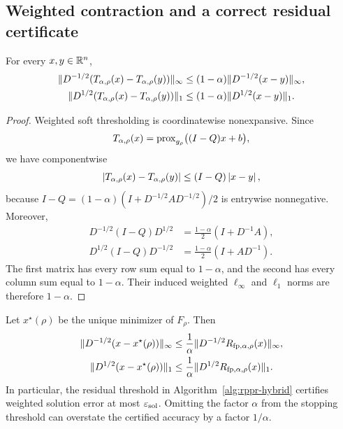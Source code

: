\subsection{Weighted contraction and a correct residual certificate}

\begin{lemma}
\label{lem:rppr-weighted-contraction}
For every $x,y\in\mathbb{R}^n$,
\begin{align}
  \lVert D^{-1/2}(T_{\alpha,\rho}(x)-T_{\alpha,\rho}(y))\rVert_\infty
  &\leq
  (1-\alpha)\lVert D^{-1/2}(x-y)\rVert_\infty,
  \label{eq:rppr-infty-contraction}\\
  \lVert D^{1/2}(T_{\alpha,\rho}(x)-T_{\alpha,\rho}(y))\rVert_1
  &\leq
  (1-\alpha)\lVert D^{1/2}(x-y)\rVert_1.
  \label{eq:rppr-l1-contraction}
\end{align}
\end{lemma}

\begin{proof}
Weighted soft thresholding is coordinatewise nonexpansive.  Since
\[
  T_{\alpha,\rho}(x)
  =\operatorname{prox}_{g_\rho}\bigl((I-Q)x+b\bigr),
\]
we have componentwise
\[
  \left\lvert T_{\alpha,\rho}(x)-T_{\alpha,\rho}(y) \right\rvert
  \leq (I-Q)\left\lvert x-y \right\rvert,
\]
because
$I-Q=(1-\alpha)(I+D^{-1/2}AD^{-1/2})/2$ is entrywise nonnegative.  Moreover,
\begin{align*}
  D^{-1/2}(I-Q)D^{1/2}
  &=\frac{1-\alpha}{2}(I+D^{-1}A),\\
  D^{1/2}(I-Q)D^{-1/2}
  &=\frac{1-\alpha}{2}(I+AD^{-1}).
\end{align*}
The first matrix has every row sum equal to $1-\alpha$, and the second has
every column sum equal to $1-\alpha$.  Their induced weighted
$\ell_\infty$ and $\ell_1$ norms are therefore $1-\alpha$.
\end{proof}

\begin{corollary}
\label{cor:rppr-residual-certificate}
Let $x^\star(\rho)$ be the unique minimizer of $F_\rho$.  Then
\begin{align}
  \lVert D^{-1/2}(x-x^\star(\rho))\rVert_\infty
  &\leq
  \frac1\alpha\lVert D^{-1/2}R_{\mathrm{fp},\alpha,\rho}(x)\rVert_\infty,
  \label{eq:rppr-infty-certificate}\\
  \lVert D^{1/2}(x-x^\star(\rho))\rVert_1
  &\leq
  \frac1\alpha\lVert D^{1/2}R_{\mathrm{fp},\alpha,\rho}(x)\rVert_1.
  \label{eq:rppr-l1-certificate}
\end{align}
In particular, the residual threshold in
Algorithm~\ref{alg:rppr-hybrid} certifies weighted solution error at most
$\varepsilon_{\mathrm{sol}}$.  Omitting the factor $\alpha$ from the stopping threshold can
overstate the certified accuracy by a factor $1/\alpha$.
\end{corollary}

